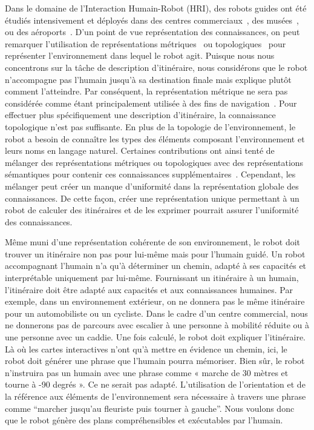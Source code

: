 Dans le domaine de l'Interaction Humain-Robot (HRI), des robots guides ont été étudiés intensivement et déployés dans des centres commerciaux~\cite{okuno_2009_providing}, des musées~\cite{burgard_1999_museum, clodic_2006_rackham, siegwart_2003_robox}, ou des aéroports~\cite{triebel_2016_spencer}. D'un point de vue représentation des connaissances, on peut remarquer l'utilisation de représentations métriques~\cite{thrun_2007_simultaneous} ou topologiques~\cite{morales_2011_modeling} pour représenter l'environnement dans lequel le robot agit. Puisque nous nous concentrons sur la tâche de description d'itinéraire, nous considérons que le robot n'accompagne pas l'humain jusqu'à sa destination finale mais explique plutôt comment l'atteindre. Par conséquent, la représentation métrique ne sera pas considérée comme étant principalement utilisée à des fins de navigation~\cite{thrun_2007_simultaneous}. Pour effectuer plus spécifiquement une description d'itinéraire, la connaissance topologique n'est pas suffisante. En plus de la topologie de l'environnement, le robot a besoin de connaître les types des éléments composant l'environnement et leurs noms en langage naturel. Certaines contributions ont ainsi tenté de mélanger des représentations métriques ou topologiques avec des représentations sémantiques pour contenir ces connaissances supplémentaires~\cite {satake_2015_should, chrastil_2014_cognitive, zender_2008_conceptual}. Cependant, les mélanger peut créer un manque d'uniformité dans la représentation globale des connaissances. De cette façon, créer une représentation unique permettant à un robot de calculer des itinéraires et de les exprimer pourrait assurer l'uniformité des connaissances.

Même muni d'une représentation cohérente de son environnement, le robot doit trouver un itinéraire non pas pour lui-même mais pour l'humain guidé. Un robot accompagnant l'humain n'a qu'à déterminer un chemin, adapté à ses capacités et interprétable uniquement par lui-même. Fournissant un itinéraire à un humain, l'itinéraire doit être adapté aux capacités et aux connaissances humaines. Par exemple, dans un environnement extérieur, on ne donnera pas le même itinéraire pour un automobiliste ou un cycliste. Dans le cadre d'un centre commercial, nous ne donnerons pas de parcours avec escalier à une personne à mobilité réduite ou à une personne avec un caddie. Une fois calculé, le robot doit expliquer l'itinéraire. Là où les cartes interactives n'ont qu'à mettre en évidence un chemin, ici, le robot doit générer une phrase que l'humain pourra mémoriser. Bien sûr, le robot n'instruira pas un humain avec une phrase comme « marche de 30 mètres et tourne à -90 degrés ». Ce ne serait pas adapté. L'utilisation de l'orientation et de la référence aux éléments de l'environnement sera nécessaire à travers une phrase comme ``marcher jusqu'au fleuriste puis tourner à gauche''. Nous voulons donc que le robot génère des plans compréhensibles et exécutables par l'humain.

